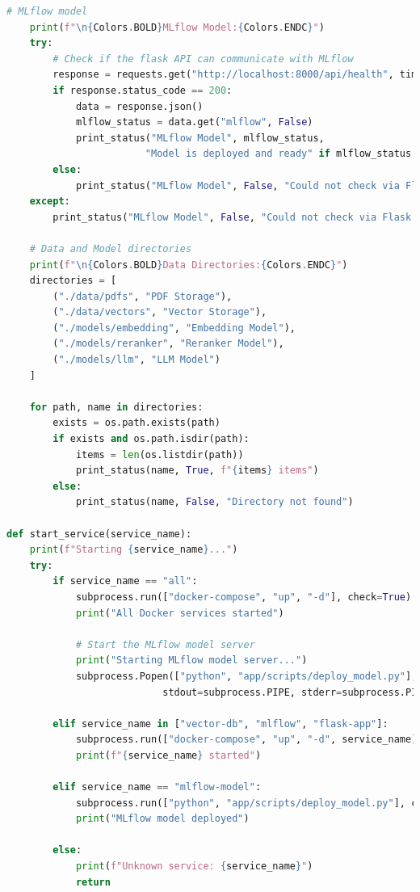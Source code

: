 \documentclass[
  screen,review,acmlarge]{acmart}
\begin{document}
\begin{lstlisting}[language=Python]
    # MLflow model
    print(f"\n{Colors.BOLD}MLflow Model:{Colors.ENDC}")
    try:
        # Check if the flask API can communicate with MLflow
        response = requests.get("http://localhost:8000/api/health", timeout=2)
        if response.status_code == 200:
            data = response.json()
            mlflow_status = data.get("mlflow", False)
            print_status("MLflow Model", mlflow_status, 
                        "Model is deployed and ready" if mlflow_status else "Model not deployed or not responding")
        else:
            print_status("MLflow Model", False, "Could not check via Flask API")
    except:
        print_status("MLflow Model", False, "Could not check via Flask API")
    
    # Data and Model directories
    print(f"\n{Colors.BOLD}Data Directories:{Colors.ENDC}")
    directories = [
        ("./data/pdfs", "PDF Storage"),
        ("./data/vectors", "Vector Storage"),
        ("./models/embedding", "Embedding Model"),
        ("./models/reranker", "Reranker Model"),
        ("./models/llm", "LLM Model")
    ]
    
    for path, name in directories:
        exists = os.path.exists(path)
        if exists and os.path.isdir(path):
            items = len(os.listdir(path))
            print_status(name, True, f"{items} items")
        else:
            print_status(name, False, "Directory not found")

def start_service(service_name):
    print(f"Starting {service_name}...")
    try:
        if service_name == "all":
            subprocess.run(["docker-compose", "up", "-d"], check=True)
            print("All Docker services started")
            
            # Start the MLflow model server
            print("Starting MLflow model server...")
            subprocess.Popen(["python", "app/scripts/deploy_model.py"], 
                           stdout=subprocess.PIPE, stderr=subprocess.PIPE)
            
        elif service_name in ["vector-db", "mlflow", "flask-app"]:
            subprocess.run(["docker-compose", "up", "-d", service_name], check=True)
            print(f"{service_name} started")
            
        elif service_name == "mlflow-model":
            subprocess.run(["python", "app/scripts/deploy_model.py"], check=True)
            print("MLflow model deployed")
            
        else:
            print(f"Unknown service: {service_name}")
            return
            

\end{lstlisting}
\end{document}
